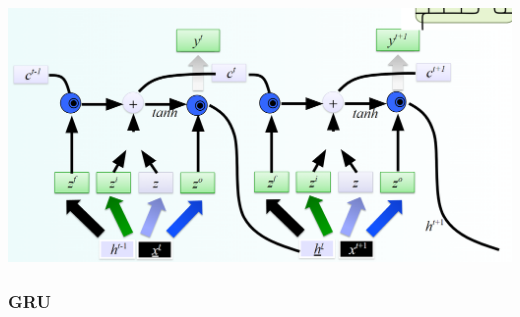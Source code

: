 \documentclass[10pt]{report}
\begin{document}
\begin{center}
	\includegraphics[scale=0.33]{35.png}
\end{center}
\subsubsection{GRU}
\end{document}
